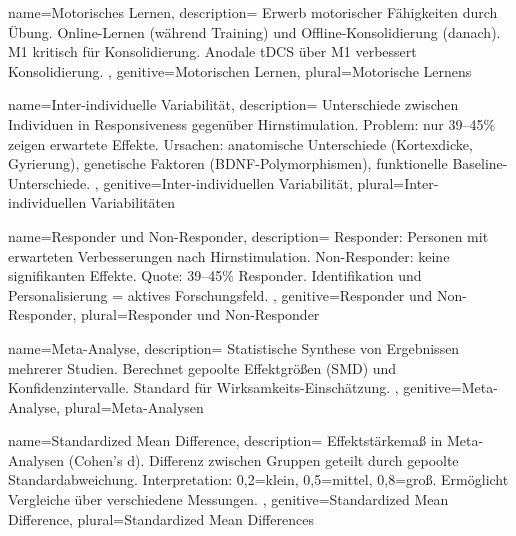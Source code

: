 {
	name=Motorisches Lernen,
	description={
			Erwerb motorischer Fähigkeiten durch Übung. Online-Lernen (während Training) und Offline-Konsolidierung (danach). \gls{M1} kritisch für Konsolidierung. Anodale \gls{tDCS} über M1 verbessert Konsolidierung. \cite{reis_noninvasive_2009}
		},
	genitive=Motorischen Lernen,
	plural=Motorische Lernens
}


{
	name=Inter-individuelle Variabilität,
	description={
			Unterschiede zwischen Individuen in Responsiveness gegenüber Hirnstimulation. Problem: nur 39--45\% zeigen erwartete Effekte. Ursachen: anatomische Unterschiede (Kortexdicke, Gyrierung), genetische Faktoren (\gls{BDNF}-Polymorphismen), funktionelle Baseline-Unterschiede. \cite{vergallito_inter-individual_2022, chew_inter-_2015}
		},
	genitive=Inter-individuellen Variabilität,
	plural=Inter-individuellen Variabilitäten
}

{
	name=Responder und Non-Responder,
	description={
			Responder: Personen mit erwarteten Verbesserungen nach Hirnstimulation. Non-Responder: keine signifikanten Effekte. Quote: 39--45\% Responder. Identifikation und Personalisierung = aktives Forschungsfeld. \cite{vergallito_inter-individual_2022}
		},
	genitive=Responder und Non-Responder,
	plural=Responder und Non-Responder
}

{
	name=Meta-Analyse,
	description={
			Statistische Synthese von Ergebnissen mehrerer Studien. Berechnet gepoolte Effektgrößen (\gls{SMD}) und Konfidenzintervalle. Standard für Wirksamkeits-Einschätzung. \cite{senkowski_boosting_2022, simonsmeier_electrical_2018}
		},
	genitive=Meta-Analyse,
	plural=Meta-Analysen
}

{
	name=Standardized Mean Difference,
	description={
			Effektstärkemaß in Meta-Analysen (Cohen's d). Differenz zwischen Gruppen geteilt durch gepoolte Standardabweichung. Interpretation: 0,2=klein, 0,5=mittel, 0,8=groß. Ermöglicht Vergleiche über verschiedene Messungen. \cite{senkowski_boosting_2022}
		},
	genitive=Standardized Mean Difference,
	plural=Standardized Mean Differences
}

